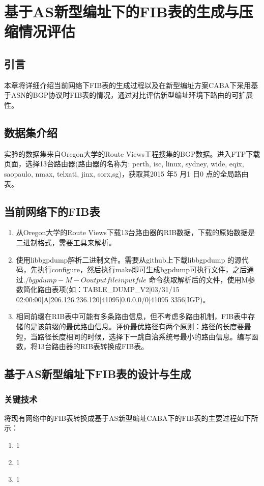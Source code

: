 

\chapter{基于AS新型编址下的FIB表的生成与压缩情况评估}
\label{dctg}
\section{引言}
本章将详细介绍当前网络下FIB表的生成过程以及在新型编址方案CABA下采用基于ASN的BGP协议时FIB表的情况，通过对比评估新型编址环境下路由的可扩展性。
\section{数据集介绍}
实验的数据集来自Oregon大学的Route Views工程搜集的BGP数据。进入FTP下载页面，选择13台路由器(路由器的名称为: perth, isc, linux, sydney, wide, eqix, saopaulo, nmax, telxati, jinx, sorx,sg)，获取其2015 年5 月1 日0 点的全局路由表。

\section{当前网络下的FIB表}

\begin{enumerate}
\item 从Oregon大学的Route Views下载13台路由器的RIB数据，下载的原始数据是二进制格式，需要工具来解析。
\item 使用libbgpdump解析二进制文件。需要从github上下载libbgpdump 的源代码，先执行configure，然后执行make即可生成bgpdump可执行文件，之后通过$./bgpdump -M -O outputfile inputfile$ 命令获取解析后的文件，使用M参数简化路由表项(如：TABLE\_DUMP\_V2|03/31/15 02:00:00|A|206.126.236.120|41095|0.0.0.0/0|41095 3356|IGP)。
\item 相同前缀在RIB表中可能有多条路由信息，但不考虑多路由机制，FIB表中存储的是该前缀的最优路由信息。评价最优路径有两个原则：路径的长度要最短，当路径长度相同的时候，选择下一跳自治系统号最小的路由信息。编写函数，将13台路由器的RIB表转换成FIB表。
\end{enumerate}

\section{基于AS新型编址下FIB表的设计与生成}
\subsection{关键技术}
将现有网络中的FIB表转换成基于AS新型编址CABA下的FIB表的主要过程如下所示：
\begin{enumerate}
\item 1
\item 1
\item 1
\end{enumerate}
